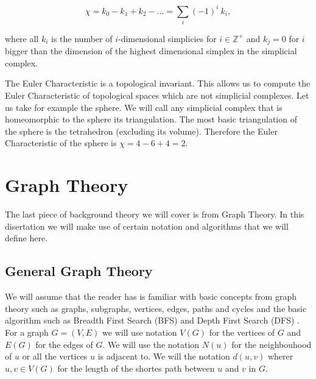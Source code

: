 %
%
%
%
%

$$ \chi = k_0 - k_1 + k_2 - ... = \sum_{i}{(-1)^i~k_i}, $$

where all $k_i$ is the number of $i$-dimensional simplicies for $i \in \mathbb{Z}^+$ and $k_j = 0$ for $i$ bigger than the dimension of the highest dimensional simplex in the simplicial complex.

The Euler Characteristic is a topological invariant. This allows us to compute the Euler Characteristic of topological spaces which are not simplicial complexes. Let us take for example the sphere. We will call any simplicial complex that is homeomorphic to the sphere its triangulation. The most basic triangulation of the sphere is the tetrahedron (excluding its volume). Therefore the Euler Characteristic of the sphere is $\chi = 4 - 6 + 4 = 2$.

\section{Graph Theory}

The last piece of background theory we will cover is from Graph Theory. In this disertation we will make use of certain notation and algorithms that we will define here.

\subsection{General Graph Theory}

We will assume that the reader has is familiar with basic concepts from graph theory such as graphs, subgraphs, vertices, edges, paths and cycles and the basic algorithm such as Breadth First Search (BFS) and Depth First Search (DFS) \cite{intro-to-algo}. For a graph $G = (V, E)$ we will use notation $V(G)$ for the vertices of $G$ and $E(G)$ for the edges of $G$. We will use the notation $N(u)$ for the neighbouhood of $u$ or all the vertices $u$ is adjacent to. We will the notation $d(u, v)$ wherer $u, v \in V(G)$ for the length of the shortes path between $u$ and $v$ in $G$.

